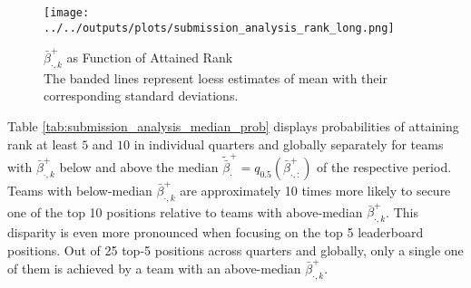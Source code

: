 \documentclass[3p,times,twocolumn]{elsarticle}
\begin{document}
\begin{figure}[!htbp]
    \centering
    \texttt{[image: ../../outputs/plots/submission\_analysis\_rank\_long.png]}
    \caption{$\bar{\beta}_{\cdot,k}^{+}$ as Function of Attained Rank\\
        The banded lines represent loess estimates of mean with their corresponding standard deviations.
    }
    \label{fig:submission_analysis_rank_long}
\end{figure}

Table \ref{tab:submission_analysis_median_prob} displays probabilities of attaining rank at least $5$ and $10$ in individual quarters and globally separately for teams with $\bar{\beta}^{+}_{\cdot,k}$ below and above the median $\tilde{\bar{\beta}}^{+}_{\cdot} = q_{0.5}(\bar{\beta}^{+}_{\cdot, :})$ of the respective period.
Teams with below-median $\bar{\beta}^{+}_{\cdot,k}$ are approximately 10 times more likely to secure one of the top 10 positions relative to teams with above-median $\bar{\beta}^{+}_{\cdot,k}$.
This disparity is even more pronounced when focusing on the top 5 leaderboard positions. 
Out of 25 top-5 positions across quarters and globally, only a single one of them is achieved by a team with an above-median $\bar{\beta}^{+}_{\cdot,k}$.
\end{document}
